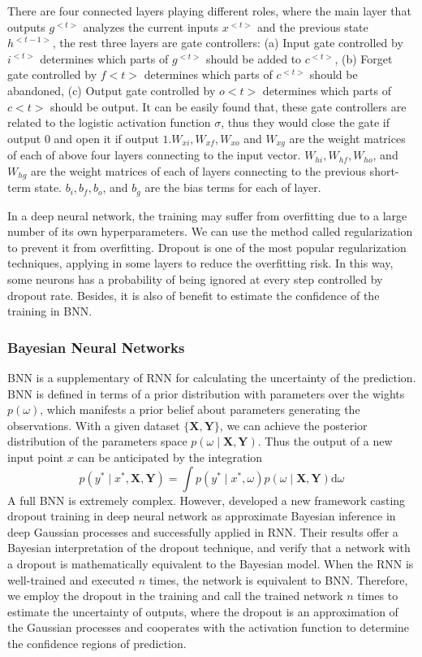 There are four connected layers playing different roles, where the main layer that outputs $g^{<t>}$ analyzes the current inputs $x^{<t>}$ and the previous state $h^{<t-1>}$, the rest three layers are gate controllers: (a) Input gate controlled by $i^{<t>}$ determines which parts of $g^{<t>}$ should be added to $c^{<t>}$, (b) Forget gate controlled by $f<t>$ determines which parts of $c^{<t>}$ should be abandoned, (c) Output gate controlled by $o<t>$ determines which parts of $c<t>$ should be output. It can be easily found that, these gate controllers are related to the logistic activation function $\sigma$, thus they would close the gate if output 0 and open it if output $1 . W_{x i}, W_{x f}, W_{x o}$ and $W_{x g}$ are the weight matrices of each of above four layers connecting to the input vector. $W_{h i}, W_{h f}, W_{h o}$, and $W_{h g}$ are the weight matrices of each of layers connecting to the previous short-term state. $b_{i}, b_{f}, b_{o}$, and $b_{g}$ are the bias terms for each of layer.

In a deep neural network, the training may suffer from overfitting due to a large number of its own hyperparameters. We can use the method called regularization to prevent it from overfitting. Dropout is one of the most popular regularization techniques, applying in some layers to reduce the overfitting risk. In this way, some neurons has a probability of being ignored at every step controlled by dropout rate. Besides, it is also of benefit to estimate the confidence of the training in BNN.

\subsubsection{Bayesian Neural Networks}
BNN is a supplementary of RNN for calculating the uncertainty of the prediction. BNN is defined in terms of a prior distribution with parameters over the wights $p(\omega)$, which manifests a prior belief about parameters generating the observations. With a given dataset $\{\mathbf{X}, \mathbf{Y}\}$, we can achieve the posterior distribution of the parameters space $p(\omega \mid \mathbf{X}, \mathbf{Y})$. Thus the output of a new input point $x$ can be anticipated by the integration
$$
p\left(y^{*} \mid x^{*}, \mathbf{X}, \mathbf{Y}\right)=\int p\left(y^{*} \mid x^{*}, \omega\right) p(\omega \mid \mathbf{X}, \mathbf{Y}) \mathrm{d} \omega
$$
A full BNN is extremely complex. However, \cite{gal2016theoretically} developed a new framework casting dropout training in deep neural network as approximate Bayesian inference in deep Gaussian processes and successfully applied in RNN. Their results offer a Bayesian interpretation of the dropout technique, and verify that a network with a dropout is mathematically equivalent to the Bayesian model. When the RNN is well-trained and executed $n$ times, the network is equivalent to BNN. Therefore, we employ the dropout in the training and call the trained network $n$ times to estimate the uncertainty of outputs, where the dropout is an approximation of the Gaussian processes and cooperates with the activation function to determine the confidence regions of prediction.